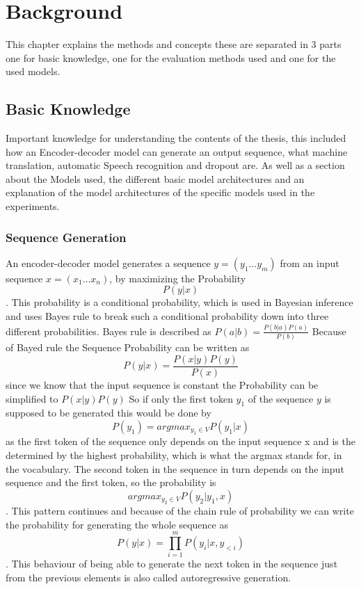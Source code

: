 \chapter{Background}
\label{ch:background}
This chapter explains the methods and concepts these are separated in 3 parts one for basic knowledge, one for the evaluation methods used and one for the used models. 

\section{Basic Knowledge}
Important knowledge for understanding the contents of the thesis, this included how an Encoder-decoder model can generate an output sequence, what machine translation, automatic Speech recognition and dropout are. As well as a section about the Models used, the different basic model architectures and an explanation of the model architectures of the specific models used in the experiments.

\subsection{Sequence Generation}\label{sect: sequence generation}
An encoder-decoder model generates a sequence $y=(y_1\dots y_m)$ from an input sequence $x=(x_1\dots x_n)$, by maximizing the Probability $$P(y|x)$$.
This probability is a conditional probability, which is used in Bayesian inference and uses Bayes rule to break such a conditional probability down into three different probabilities. Bayes rule is described as $P(a|b)=\frac{P(b|a)P(a)}{P(b)}$ 
Because of Bayed rule the Sequence Probability can be written as $$P(y|x)= \frac{P(x|y)P(y)}{P(x)}$$ since we know that the input sequence is constant the Probability can be simplified to $P(x|y)P(y)$
So if only the first token $y_1$ of the sequence $y$ is supposed to be generated this would be done by $$P(y_1)=argmax _{y_1\in V} P(y_1|x)$$ as the first token of the sequence only depends on the input sequence x and is the determined by the highest probability, which is what the argmax stands for, in the vocabulary. 
The second token in the sequence in turn depends on the input sequence and the first token, so the probability is 
$$argmax_{y_2\in V}P(y_2|y_1,x)$$. This pattern continues and because of the chain rule of probability we can write the probability for generating the whole sequence as $$P(y|x)= \prod_{i=1}^m P(y_i|x, y_{<i})$$. \cite[chapters~3, 9.5, 10, 13]{jm3}
This behaviour of being able to generate the next token in the sequence just from the previous elements is also called autoregressive generation. 

